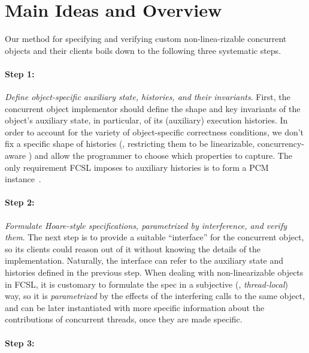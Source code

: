 \section{Main Ideas and Overview}
\label{sec:overview}

Our method for specifying and verifying custom non-linea-rizable
concurrent objects and their clients boils down to the following three
systematic steps.

\paragraph{Step 1:} 

\emph{Define object-specific auxiliary state, histories, and their
  invariants}.
%
First, the concurrent object implementor should define the shape and
key invariants of the object's auxiliary state, in particular, of its
(auxiliary) execution histories.
%
In order to account for the variety of object-specific correctness
conditions, we don't fix a specific shape of histories (\eg,
restricting them to be linearizable, concurrency-aware \etc) and allow
the programmer to choose which properties to capture. The only
requirement FCSL imposes to auxiliary histories is to form a PCM
instance~\cite{Sergey-al:ESOP15}.

\paragraph{Step 2:} 

\emph{Formulate Hoare-style specifications, parametrized by
  interference, and verify them}.
%
The next step is to provide a suitable ``interface'' for the
concurrent object, so its clients could reason out of it without
knowing the details of the implementation. 
%
Naturally, the interface can refer to the auxiliary state and
histories defined in the previous step.
%
When dealing with non-linearizable objects in FCSL, it is customary to
formulate the spec in a subjective (\ie, \emph{thread-local}) way, so
it is \emph{parametrized} by the effects of the interfering calls to
the same object, and can be later instantiated with more specific
information about the contributions of concurrent threads, once they
are made specific.

\paragraph{Step 3:} 

